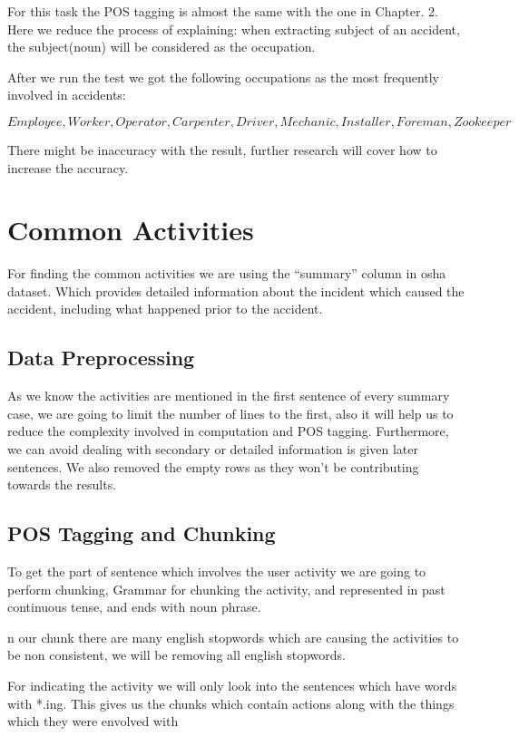 \documentclass[DIV=calc, paper=a4, fontsize=11pt, twocolumn]{scrartcl}	 %
\begin{document}
For this task the POS tagging is almost the same with the one in
Chapter. 2. Here we reduce the process of explaining: when extracting
subject of an accident, the subject(noun) will be considered as the
occupation.

After we run the test we got the following occupations as the most
frequently involved in accidents:

$$Employee, Worker, Operator, Carpenter, Driver, Mechanic, Installer,
Foreman, Zookeeper$$

There might be inaccuracy with the result, further research will cover
how to increase the accuracy.


\section{Common Activities}

For finding the common activities we are using the “summary” column in
osha dataset. Which provides detailed information about the incident
which caused the accident, including what happened prior to the
accident.


\subsection{Data Preprocessing}

As we know the activities are mentioned in the first sentence of every summary case, we are going to limit the number of lines to the first, also it will help us to reduce the complexity involved in computation and POS tagging. Furthermore, we can avoid dealing with secondary or detailed information is given later sentences.
We also removed the empty rows as they won’t be contributing towards
the results.




\subsection{POS Tagging and Chunking}

To get the part of sentence which involves the user activity we are
going to perform chunking, Grammar for chunking the activity, and
represented in past continuous tense, and ends with noun phrase.

n our chunk there are many english stopwords which are causing the activities to be non consistent, we will be removing all english stopwords.


For indicating the activity we will only look into the sentences which have words with *.ing. This
gives us the chunks which contain actions along with the things which they were envolved with
\end{document}
